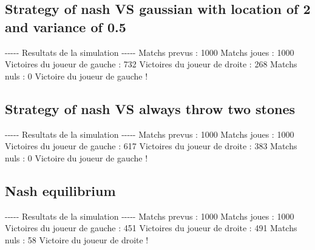 \documentclass{article}%
\begin{document}
%
\subsection{Strategy of nash VS gaussian with location of 2 and variance of 0.5}%
\label{subsec:Strategy of nash VS gaussian with location of 2 and variance of 0.5}%
{-}{-}{-}{-}{-} Resultats de la simulation {-}{-}{-}{-}{-}\newline%
		\newline%
Matchs prevus : 1000\newline%
Matchs joues : 1000\newline%
\newline%
Victoires du joueur de gauche : 732\newline%
Victoires du joueur de droite : 268\newline%
Matchs nuls : 0\newline%
\newline%
Victoire du joueur de gauche !

%
\subsection{Strategy of nash VS always throw two stones}%
\label{subsec:Strategy of nash VS always throw two stones}%
{-}{-}{-}{-}{-} Resultats de la simulation {-}{-}{-}{-}{-}\newline%
		\newline%
Matchs prevus : 1000\newline%
Matchs joues : 1000\newline%
\newline%
Victoires du joueur de gauche : 617\newline%
Victoires du joueur de droite : 383\newline%
Matchs nuls : 0\newline%
\newline%
Victoire du joueur de gauche !

%
\subsection{Nash equilibrium}%
\label{subsec:Nash equilibrium}%
{-}{-}{-}{-}{-} Resultats de la simulation {-}{-}{-}{-}{-}\newline%
		\newline%
Matchs prevus : 1000\newline%
Matchs joues : 1000\newline%
\newline%
Victoires du joueur de gauche : 451\newline%
Victoires du joueur de droite : 491\newline%
Matchs nuls : 58\newline%
\newline%
Victoire du joueur de droite !
\end{document}
